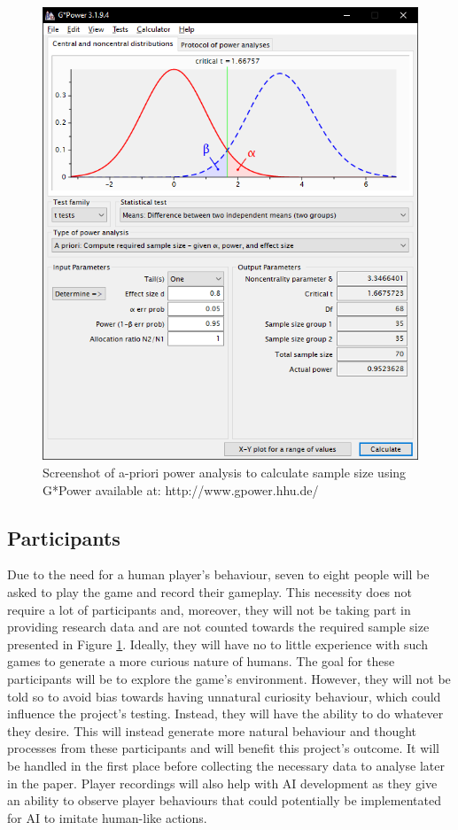 \documentclass[journal]{IEEEtran}
\begin{document}
\begin{figure}
	\includegraphics[width=\linewidth]{GPower.PNG}
	\caption{Screenshot of a-priori power analysis to calculate sample size using G*Power available at: http://www.gpower.hhu.de/}
	\label{fig:gpower}
\end{figure}

\subsection{Participants} %
Due to the need for a human player's behaviour, seven to eight people will be asked to play the game and record their gameplay. This necessity does not require a lot of participants and, moreover, they will not be taking part in providing research data and are not counted towards the required sample size presented in Figure \ref{fig:gpower}. Ideally, they will have no to little experience with such games to generate a more curious nature of humans. The goal for these participants will be to explore the game's environment. However, they will not be told so to avoid bias towards having unnatural curiosity behaviour, which could influence the project's testing. Instead, they will have the ability to do whatever they desire. This will instead generate more natural behaviour and thought processes from these participants and will benefit this project's outcome. It will be handled in the first place before collecting the necessary data to analyse later in the paper. Player recordings will also help with AI development as they give an ability to observe player behaviours that could potentially be implementated for AI to imitate human-like actions.
\end{document}

